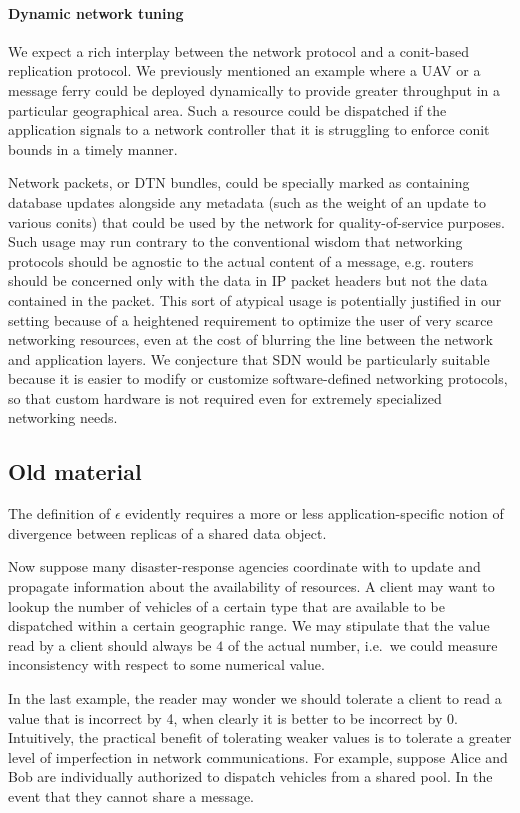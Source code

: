 \documentclass[]             %
{NASA}                       %
\theoremstyle{definition}
\begin{document}
\paragraph{Dynamic network tuning}
We expect a rich interplay between the network protocol and a
conit-based replication protocol. We previously mentioned an example
where a UAV or a message ferry could be deployed dynamically to
provide greater throughput in a particular geographical area. Such a
resource could be dispatched if the application signals to a network
controller that it is struggling to enforce conit bounds in a timely
manner.

Network packets, or DTN bundles, could be specially marked as
containing database updates alongside any metadata (such as the weight
of an update to various conits) that could be used by the network for
quality-of-service purposes. Such usage may run contrary to the
conventional wisdom that networking protocols should be agnostic to
the actual content of a message, e.g. routers should be concerned only
with the data in IP packet headers but not the data contained in the
packet. This sort of atypical usage is potentially justified in our
setting because of a heightened requirement to optimize the user of
very scarce networking resources, even at the cost of blurring the
line between the network and application layers. We conjecture that
SDN would be particularly suitable because it is easier to modify or
customize software-defined networking protocols, so that custom
hardware is not required even for extremely specialized networking
needs.

\subsection{Old material}

The definition of \(\epsilon\) evidently requires a more or less
application-specific notion of divergence between replicas of a shared
data object.

Now suppose many disaster-response agencies coordinate with to update
and propagate information about the availability of resources. A client
may want to lookup the number of vehicles of a certain type that are
available to be dispatched within a certain geographic range. We may
stipulate that the value read by a client should always be \(4\) of the
actual number, i.e.~we could measure inconsistency with respect to some
numerical value.

In the last example, the reader may wonder we should tolerate a client
to read a value that is incorrect by 4, when clearly it is better to be
incorrect by 0. Intuitively, the practical benefit of tolerating weaker
values is to tolerate a greater level of imperfection in network
communications. For example, suppose Alice and Bob are individually
authorized to dispatch vehicles from a shared pool. In the event that
they cannot share a message.
\end{document}
